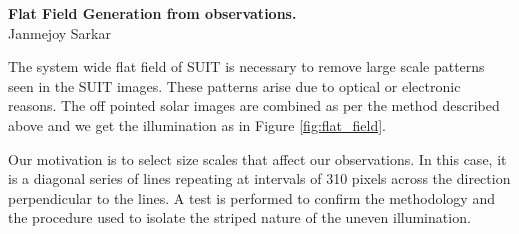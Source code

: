 \documentclass[11pt,a4paper]{article}
\begin{document}
\begin{center}
		\Large \textbf{Flat Field Generation from observations.}\\
		\normalsize Janmejoy Sarkar
\end{center}
	The system wide flat field of SUIT is necessary to remove large scale patterns seen in the SUIT images. These patterns 	arise due to optical or electronic reasons. The off pointed solar images are combined as per the method described above and we get the illumination as in Figure \ref{fig:flat_field}. 
	
	Our motivation is to select size scales that affect our observations. In this case, it is a diagonal series of lines repeating at intervals of 310 pixels across the direction perpendicular to the lines. A test is performed to confirm the methodology and the procedure used to isolate the striped nature of the uneven illumination.
	
\end{document}
